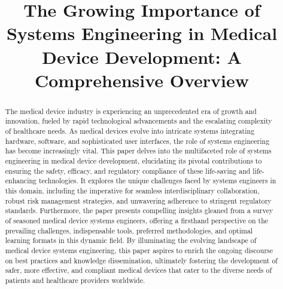 \documentclass[conference]{IEEEtran}
\begin{document}
\title{The Growing Importance of Systems Engineering in Medical Device Development: A Comprehensive Overview}

\author{
\and
{}
\and
{}
}


\maketitle

\begin{abstract}
    The medical device industry is experiencing an unprecedented era of 
    growth and innovation, fueled by rapid technological advancements and 
    the escalating complexity of healthcare needs. As medical devices evolve 
    into intricate systems integrating hardware, software, and sophisticated 
    user interfaces, the role of systems engineering has become increasingly 
    vital. This paper delves into the multifaceted role of systems 
    engineering in medical device development, elucidating its pivotal 
    contributions to ensuring the safety, efficacy, and regulatory compliance 
    of these life-saving and life-enhancing technologies. It explores the 
    unique challenges faced by systems engineers in this domain, including 
    the imperative for seamless interdisciplinary collaboration, robust 
    risk management strategies, and unwavering adherence to stringent 
    regulatory standards. Furthermore, the paper presents compelling 
    insights gleaned from a survey of seasoned medical device systems 
    engineers, offering a firsthand perspective on the prevailing 
    challenges, indispensable tools, preferred methodologies, and 
    optimal learning formats in this dynamic field. By illuminating the 
    evolving landscape of medical device systems engineering, this paper 
    aspires to enrich the ongoing discourse on best practices and 
    knowledge dissemination, ultimately fostering the development of 
    safer, more effective, and compliant medical devices that cater 
    to the diverse needs of patients and healthcare providers worldwide.
\end{abstract}
\end{document}
